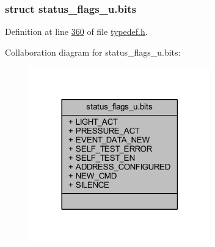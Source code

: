 \subsubsection{struct status\+\_\+flags\+\_\+u.\+bits}


Definition at line \hyperlink{a00001_source_l00360}{360} of file \hyperlink{a00001_source}{typedef.\+h}.



Collaboration diagram for status\+\_\+flags\+\_\+u.\+bits\+:
\nopagebreak
\begin{figure}[H]
\begin{center}
\leavevmode
\includegraphics[width=222pt]{d5/d35/a00266}
\end{center}
\end{figure}
